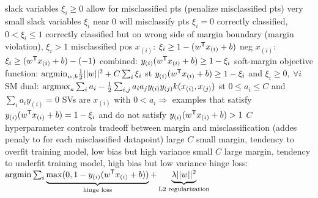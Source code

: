 \documentclass[10pt]{article}
\begin{document}
\NEW slack variables $\xi_i \geq 0$ allow for misclassified pts (penalize misclassified pts)
\NEW very small slack variables $\xi_i$ near 0 will misclassify pts
\NEW $\xi_i=0$ correctly classified, $0< \xi_i \leq 1$ correctly classified but on wrong side of margin boundary (margin violation), $\xi_i>1$ misclassified
\NEW pos $x_{(i)}$: $\xi_i \geq 1 - (w^{\mathsf{T}} x_{(i)} + b)$
\NEW neg $x_{(i)}$: $\xi_i \geq (w^{\mathsf{T}} x_{(i)} + b) - (-1)$
\NEW combined: $y_{(i)}(w^{\mathsf{T}} x_{(i)} + b) \geq 1 - \xi_i$
\NEW soft-margin objective function: $\mathrm{argmin}_{w,b} \frac{1}{2}||w||^2 + C \sum_i \xi_i$ st $y_{(i)}(w^{\mathsf{T}} x_{(i)} + b) \geq 1 - \xi_i$ and $\xi_i \geq 0,\ \forall i$
\NEW SM dual: $\mathrm{argmax}_a \sum_i a_i - \frac{1}{2} \sum_{i,j} a_i a_j y_{(i)} y_{(j)} k(x_{(i)},x_{(j)})$ st $0 \leq a_i \leq C$ and $\sum_i a_i y_{(i)} = 0$
\NEW SVs are $x_{(i)}$ with $0 < a_i \Rightarrow$ examples that satisfy $y_{(i)}(w^{\mathsf{T}} x_{(i)} + b) = 1 - \xi_i$ and do not satisfy $y_{(i)}(w^{\mathsf{T}} x_{(i)} + b) >1 $
\NEW $C$ hyperparameter controls tradeoff between margin and misclassification (addes penaly to for each misclassified datapoint)
\NEW large $C$ small margin, tendency to overfit training model, low bias but high variance
\NEW small $C$ large margin, tendency to underfit training model, high bias but low variance
\NEW hinge loss: $\mathrm{argmin} \sum_i \underbrace{\max(0, 1 - y_{(i)}(w^{\mathsf{T}} x_{(i)} + b))}_{\text{hinge loss}} + \underbrace{\lambda ||w||^2}_{\text{L2 regularization}}$


\end{document}
